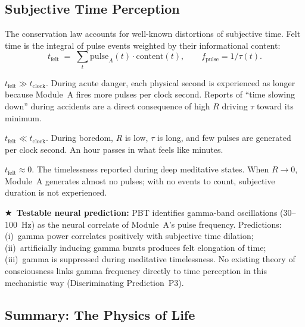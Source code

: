 \documentclass[12pt,a4paper]{article}
\newcommand{\pp}[1]{\textbf{#1}}
\newcommand{\starred}{\textbf{\textcolor{pbtblue}{$\bigstar$}}~}
\begin{document}
\subsection{Subjective Time Perception}

The conservation law accounts for well-known distortions of subjective time.
Felt time is the integral of pulse events weighted by their informational content:
\begin{equation}
  t_{\mathrm{felt}} \;=\; \sum_t \mathrm{pulse}_A(t)\cdot\mathrm{content}(t),
  \qquad
  f_{\mathrm{pulse}} = 1/\tau(t).
  \label{eq:time}
\end{equation}

\begin{description}[leftmargin=1.4em]
  \item[\pp{High $R$, short $\tau$, high pulse frequency:}]
    $t_{\mathrm{felt}} \gg t_{\mathrm{clock}}$. During acute danger, each
    physical second is experienced as longer because Module~A fires more pulses
    per clock second. Reports of ``time slowing down'' during accidents are a
    direct consequence of high $R$ driving $\tau$ toward its minimum.
  \item[\pp{Low $R$, long $\tau$, low pulse frequency:}]
    $t_{\mathrm{felt}} \ll t_{\mathrm{clock}}$. During boredom, $R$ is low,
    $\tau$ is long, and few pulses are generated per clock second. An hour
    passes in what feels like minutes.
  \item[\pp{$R\approx 0$, $\mathrm{pulse}\approx 0$:}]
    $t_{\mathrm{felt}}\approx 0$. The timelessness reported during deep
    meditative states. When $R\to 0$, Module~A generates almost no pulses; with
    no events to count, subjective duration is not experienced.
\end{description}

\starred\textbf{Testable neural prediction:} PBT identifies gamma-band
oscillations ($30$--$100$~Hz) as the neural correlate of Module~A's pulse
frequency. Predictions: (i)~gamma power correlates positively with subjective
time dilation; (ii)~artificially inducing gamma bursts produces felt elongation
of time; (iii)~gamma is suppressed during meditative timelessness. No existing
theory of consciousness links gamma frequency directly to time perception in
this mechanistic way (Discriminating Prediction~P3).

\subsection{Summary: The Physics of Life}
\end{document}
